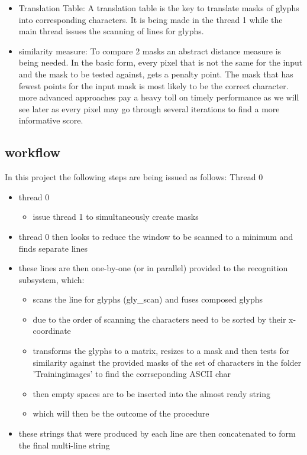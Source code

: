 \documentclass[12pt]{scrartcl}
\begin{document}
\begin{itemize}
\item Translation Table: A translation table is the key to translate masks of glyphs into corresponding characters. It is being made in the thread 1 while the main thread issues the scanning of lines for glyphs.

\item similarity measure: To compare 2 masks an abstract distance measure is being needed. In the basic form, every pixel that is not the same for the input and the mask to be tested against, gets a penalty point. The mask that has fewest points for the input mask is most likely to be the correct character.\newline
more advanced approaches pay a heavy toll on timely performance as we will see later as every pixel may go through several iterations to find a more informative score.\newline

\end{itemize}

  \subsection{workflow}
In this project the following steps are being issued as follows:\newline
Thread 0
\begin{itemize}
\item thread 0
  \begin{itemize}
    \item issue thread 1 to simultaneously create masks
  \end {itemize}
\item thread 0 then looks to reduce the window to be scanned to a minimum and finds separate lines
\item these lines are then one-by-one (or in parallel) provided to the recognition subsystem, which:
  \begin{itemize}
  \item scans the line for glyphs (gly\_scan) and fuses composed glyphs
  \item due to the order of scanning the characters need to be sorted by their x-coordinate  
  \item transforms the glyphs to a matrix, resizes to a mask and then tests for similarity against the provided masks of the set of characters in the folder 'Trainingimages' to find the corrseponding ASCII char  
  \item then empty spaces are to be inserted into the almost ready string
  \item which will then be the outcome of the procedure
  \end{itemize}
\item these strings that were produced by each line are then concatenated to form the final multi-line string
\end{itemize}
\end{document}
